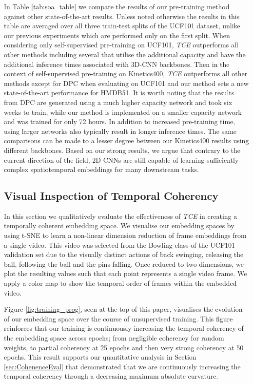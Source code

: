\documentclass[a4paper,conference]{IEEEtran}
\begin{document}
In Table \ref{tab:soa_table} we compare the results of our pre-training method against other state-of-the-art results. Unless noted otherwise the results in this table are averaged over all three train-test splits of the UCF101 dataset, unlike our previous experiments which are performed only on the first split.  When considering only self-supervised pre-training on UCF101, \textit{TCE} outperforms all other methods including several that utilise the additional capacity and have the additional inference times associated with 3D-CNN backbones. Then in the context of self-supervised pre-training on Kinetics400, \textit{TCE} outperforms all other methods except for DPC \cite{han2019video} when evaluating on UCF101 and our method sets a new state-of-the-art performance for HMDB51. It is worth noting that the results from DPC are generated using a much higher capacity network and took six weeks to train, while our method is implemented on a smaller capacity network and was trained for only 72 hours. In addition to increased pre-training time, using larger networks also typically result in longer inference times. The same comparisons can be made to a lesser degree between our Kinetics400 results using different backbones. Based on our strong results, we argue that contrary to the current direction of the field, 2D-CNNs are still capable of learning sufficiently complex spatiotemporal embeddings for many downstream tasks. \subsection{Visual Inspection of Temporal Coherency}
\label{sec:Visual}
In this section we qualitatively evaluate the effectiveness of \textit{TCE} in creating a temporally coherent embedding space. We visualise our embedding spaces by using t-SNE to learn a non-linear dimension reduction of frame embeddings from a single video. This video was selected from the Bowling class of the UCF101 validation set due to the visually distinct actions of back swinging, releasing the ball, following the ball and the pins falling. Once reduced to two dimensions, we plot the resulting values such that each point represents a single video frame. We apply a color map to show the temporal order of frames within the embedded video.

Figure \ref{fig:training_prog}, seen at the top of this paper, visualises the evolution of our embedding space over the course of unsupervised training. This figure reinforces that our training is continuously increasing the temporal coherency of the embedding space across epochs; from negligible coherency for random weights, to partial coherency at 25 epochs and then very strong coherency at 50 epochs. This result supports our quantitative analysis in Section \ref{sec:CohenenceEval} that demonstrated that we are continuously increasing the temporal coherency through a decreasing maximum absolute curvature.
\end{document}
